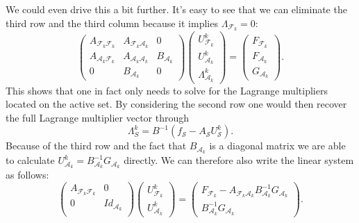 \documentclass{article}
\begin{document}
We could even drive this a bit further.
It's easy to see that we can eliminate the third row and the third column
because it implies $\Lambda_{\mathcal{F}_k} = 0$:
\begin{equation*}
\begin{pmatrix}
 A_{\mathcal{F}_k\mathcal{F}_k} & A_{\mathcal{F}_k\mathcal{A}_k} & 0\\
 A_{\mathcal{A}_k\mathcal{F}_k} & A_{\mathcal{A}_k\mathcal{A}_k} & B_{\mathcal{A}_k}\\
 0 & B_{\mathcal{A}_k} & 0
\end{pmatrix}
\begin{pmatrix}
 U^k_{\mathcal{F}_k}\\ U^k_{\mathcal{A}_k}\\ \Lambda^k_{\mathcal{A}_k}
\end{pmatrix}
=
\begin{pmatrix}
 F_{\mathcal{F}_k}\\ F_{\mathcal{A}_k}\\ G_{\mathcal{A}_k}
\end{pmatrix}.
\end{equation*}
This shows that one in fact only needs to solve for the Lagrange multipliers
located on the active set. By considering the second row one would then recover
the full Lagrange multiplier vector through
\begin{equation*}
 \Lambda^k_S = B^{-1}\left(f_{\mathcal{S}} - A_{\mathcal{S}}U^k_{\mathcal{S}}\right).
\end{equation*}
Because of the third row and the fact that $B_{\mathcal{A}_k}$ is a diagonal matrix we are able
to calculate $U^k_{\mathcal{A}_k}=B^{-1}_{\mathcal{A}_k}G_{\mathcal{A}_k}$ directly. We can therefore also write the
linear system as follows:
\begin{equation*}
\begin{pmatrix}
 A_{\mathcal{F}_k\mathcal{F}_k} & 0\\
 0 & Id_{\mathcal{A}_k} \\
\end{pmatrix}
\begin{pmatrix}
 U^k_{\mathcal{F}_k}\\ U^k_{\mathcal{A}_k}
\end{pmatrix}
=
\begin{pmatrix}
 F_{\mathcal{F}_k} - A_{\mathcal{F}_k\mathcal{A}_k}B^{-1}_{\mathcal{A}_k}G_{\mathcal{A}_k}
 \\
 B_{\mathcal{A}_k}^{-1}G_{\mathcal{A}_k}
\end{pmatrix}.
\end{equation*}
\end{document}
